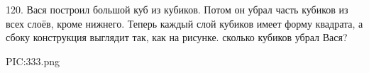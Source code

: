 120. Вася построил большой куб из кубиков. Потом он убрал часть кубиков из всех слоёв, кроме нижнего. Теперь каждый слой кубиков имеет форму квадрата, а сбоку конструкция выглядит так, как на рисунке. сколько кубиков убрал Вася?
\begin{center}
{{PIC:333.png}}
\end{center}

